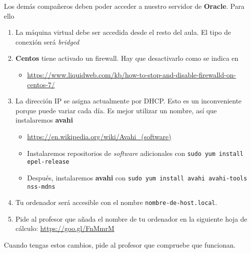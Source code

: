 \begin{homeworkProblem}

  Los demás compañeros deben poder acceder a nuestro servidor de \textbf{Oracle}. Para ello
  \begin{enumerate}
  \item La máquina virtual debe ser accedida desde el resto del aula. El tipo de conexión será \textit{bridged}
  \item \textbf{Centos} tiene activado un firewall. Hay que desactivarlo como se indica en
    \begin{itemize}
    \item  \url{https://www.liquidweb.com/kb/how-to-stop-and-disable-firewalld-on-centos-7/}
    \end{itemize}
    
  \item La dirección IP se asigna actualmente por DHCP. Esto es un inconveniente porque puede variar cada día. Es mejor utilizar un nombre, así que instalaremos \textbf{avahi}
    \begin{itemize}
    \item \url{https://en.wikipedia.org/wiki/Avahi\_(software)}
    \item Instalaremos repositorios de \textit{software} adicionales con \texttt{sudo yum install epel-release}
    \item Después, instalaremos \textbf{avahi} con \texttt{sudo yum install avahi avahi-tools nss-mdns}

    \end{itemize}

  \item Tu ordenador será accesible con el nombre \texttt{nombre-de-host.local}.
  \item Pide al profesor que añada el nombre de tu ordenador en la siguiente hoja de cálculo: \url{https://goo.gl/FnMmrM}
    
    
  \end{enumerate}

  Cuando tengas estos cambios, pide al profesor que compruebe que funcionan.
\end{homeworkProblem}


